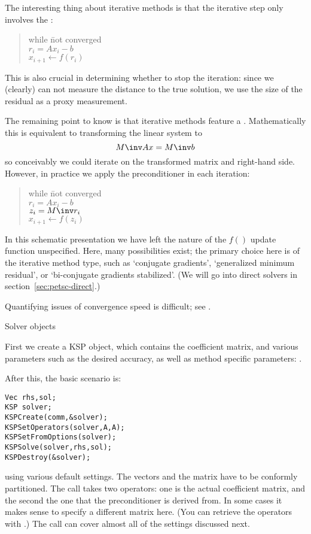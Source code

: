 The interesting thing about iterative methods is that the iterative step
only involves the :

\begin{quote}
  \begin{tabbing}
    while \=not converged\\
    \> $r_i = Ax_i-b$\\
    \> $x_{i+1}\leftarrow f(r_i)$
  \end{tabbing}
\end{quote}

This  is also crucial in determining whether to stop the iteration:
since we (clearly) can not measure the distance to the true solution, we use
the size of the residual as a proxy measurement.

The remaining point to know is that iterative methods feature a .
Mathematically this is equivalent to transforming the linear system to
\[ M\inv Ax=M\inv b \]
so conceivably we could iterate on the transformed matrix and right-hand side.
However, in practice we apply the preconditioner in each iteration:

\begin{quote}
  \begin{tabbing}
    while \=not converged\\
    \> $r_i = Ax_i-b$\\
    \> $z_i = M\inv r_i$\\
    \> $x_{i+1}\leftarrow f(z_i)$
  \end{tabbing}
\end{quote}

In this schematic presentation we have left the nature of the $f()$ update
function unspecified. Here, many possibilities exist; the primary
choice here is of the iterative method type, such as `conjugate gradients',
`generalized minimum residual', or `bi-conjugate gradients stabilized'.
(We will go into direct solvers in section~\ref{sec:petsc-direct}.)

Quantifying issues of convergence speed is difficult;
see .

 {Solver objects}

First we create a KSP object, which contains the coefficient matrix,
and various parameters such as the desired accuracy,
as well as method specific parameters:
%
.

After this, the basic scenario is:
\begin{lstlisting}
Vec rhs,sol;
KSP solver;
KSPCreate(comm,&solver);
KSPSetOperators(solver,A,A);
KSPSetFromOptions(solver);
KSPSolve(solver,rhs,sol);
KSPDestroy(&solver);
\end{lstlisting}
using various default settings. The vectors and the matrix have to be
conformly partitioned.
The  call
takes two operators: one is the actual coefficient matrix, and the second
the one that the preconditioner is derived from.
In some cases it makes sense
to specify a different matrix here.
(You can retrieve the operators with .)
The call  can cover almost all of the 
settings discussed next.

